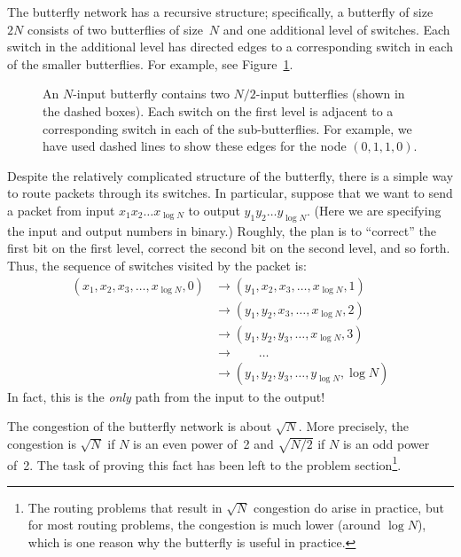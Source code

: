 The butterfly network has a recursive structure; specifically, a
butterfly of size~$2N$ consists of two butterflies of size~$N$ and one
additional level of switches.  Each switch in the additional level has
directed edges to a corresponding switch in each of the smaller
butterflies.  For example, see Figure~\ref{fig:6EP}.

\begin{figure}



\caption{An $N$-input butterfly contains two $N/2$-input butterflies
  (shown in the dashed boxes). Each switch on the first level is
  adjacent to a corresponding switch in each of the sub-butterflies.
  For example, we have used dashed lines to show these edges for the
  node $(0, 1, 1, 0)$.}

\label{fig:6EP}

\end{figure}

Despite the relatively complicated structure of the butterfly, there
is a simple way to route packets through its switches.  In particular,
suppose that we want to send a packet from input $x_1 x_2 \dots
x_{\log N}$ to output $y_1 y_2 \dots y_{\log N}$.  (Here we are
specifying the input and output numbers in binary.)  Roughly, the plan
is to ``correct'' the first bit on the first level, correct the second
bit on the second level, and so forth.  Thus, the sequence of switches
visited by the packet is:
%
\begin{align*}
(x_1, x_2, x_3, \dots, x_{\log N}, 0)
    & \to (y_1, x_2, x_3, \dots, x_{\log N}, 1) \\
    & \to (y_1, y_2, x_3, \dots, x_{\log N}, 2) \\
    & \to (y_1, y_2, y_3, \dots, x_{\log N}, 3) \\
    & \to \qquad \dots \\
    & \to (y_1, y_2, y_3, \dots, y_{\log N}, \log N)
\end{align*}
%
In fact, this is the \emph{only} path from the input to the output!

The congestion of the butterfly network is about $\sqrt{N}$.  More
precisely, the congestion is $\sqrt{N}$ if $N$ is an even power of~2
and $\sqrt{N/2}$ if $N$ is an odd power of~2.  The task of proving
this fact has been left to the problem section\footnote{The routing
  problems that result in $\sqrt{N}$ congestion do arise in practice,
  but for most routing problems, the congestion is much lower (around
  $\log N$), which is one reason why the butterfly is useful in
  practice.}.

